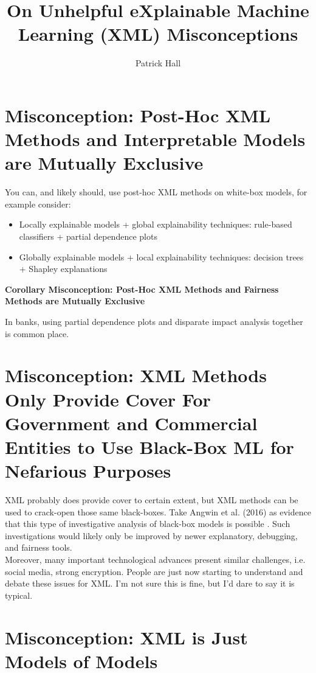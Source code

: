 \documentclass[fleqn]{article}
\title{On Unhelpful eXplainable Machine Learning (XML) Misconceptions}
\author{Patrick Hall}
\begin{document}
\maketitle

\vspace{-0.25in}

\section{Misconception: Post-Hoc XML Methods and Interpretable Models are Mutually Exclusive}

You can, and likely should, use post-hoc XML methods on white-box models, for example consider:

\begin{itemize}
\item Locally explainable models + global explainability techniques: rule-based classifiers + partial dependence plots
\item Globally explainable models + local explainability techniques: decision trees + Shapley explanations
\end{itemize}

\textbf{Corollary Misconception: Post-Hoc XML Methods and Fairness Methods are Mutually Exclusive}

In banks, using partial dependence plots and disparate impact analysis together is common place.

\section{Misconception: XML Methods Only Provide Cover For Government and Commercial Entities to Use Black-Box ML for Nefarious Purposes}

XML probably does provide cover to certain extent, but XML methods can be used to crack-open those same black-boxes. Take Angwin et al. (2016) as evidence that this type of investigative analysis of black-box models is possible \cite{angwin16}. Such investigations would likely only be improved by newer explanatory, debugging, and fairness tools. \\

Moreover, many important technological advances present similar challenges, i.e. social media, strong encryption.  People are just now starting to understand and debate these issues for XML. I'm not sure this is fine, but I'd dare to say it is typical.

\section{Misconception: XML is Just Models of Models}
\end{document}
